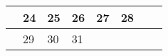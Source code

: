 {\begin{tabularx}{\linewidth}{|l!{\vrule width \myLenLineThicknessThick}*{7}{@{}X@{}|}}
       & 
    
      
      
        \begin{minipage}[t]{6mm}\centering{}24\end{minipage}
      
       & 
    
      
      
        \begin{minipage}[t]{6mm}\centering{}25\end{minipage}
      
       & 
    
      
      
        \begin{minipage}[t]{6mm}\centering{}26\end{minipage}
      
       & 
    
      
      
        \begin{minipage}[t]{6mm}\centering{}27\end{minipage}
      
       & 
    
      
      
        \begin{minipage}[t]{6mm}\centering{}28\end{minipage}
      
      
        \\  \hline 
      
    
  
  
  
  \hyperlink{week-2025-52}{} &
    
      
      
        \begin{minipage}[t]{6mm}\centering{}29\end{minipage}
      
       & 
    
      
      
        \begin{minipage}[t]{6mm}\centering{}30\end{minipage}
      
       & 
    
      
      
        \begin{minipage}[t]{6mm}\centering{}31\end{minipage}
      

\end{tabularx}}
